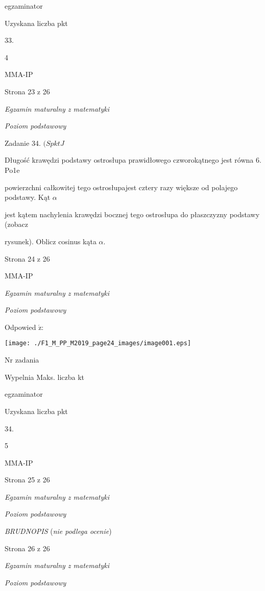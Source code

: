 \documentclass[a4paper,12pt]{article}
\begin{document}
egzaminator

Uzyskana liczba pkt

33.

4

MMA-IP

Strona 23 z 26





{\it Egzamin maturalny z matematyki}

{\it Poziom podstawowy}

Zadanie 34. $(SpktJ$

Długość krawędzi podstawy ostrosłupa prawidłowego czworokątnego jest równa 6. Po1e

powierzchni całkowitej tego ostrosłupajest cztery razy większe od polajego podstawy. Kąt $\alpha$

jest kątem nachylenia krawędzi bocznej tego ostrosłupa do płaszczyzny podstawy (zobacz

rysunek). Oblicz cosinus kąta $\alpha.$

Strona 24 z 26

MMA-IP





{\it Egzamin maturalny z matematyki}

{\it Poziom podstawowy}

Odpowied $\acute{\mathrm{z}}$:
\begin{center}
\texttt{[image: ./F1\_M\_PP\_M2019\_page24\_images/image001.eps]}
\end{center}
Nr zadania

Wypelnia Maks. liczba kt

egzaminator

Uzyskana liczba pkt

34.

5

MMA-IP

Strona 25 z 26





{\it Egzamin maturalny z matematyki}

{\it Poziom podstawowy}

{\it BRUDNOPIS} ({\it nie podlega ocenie})

Strona 26 z 26





{\it Egzamin maturalny z matematyki}

{\it Poziom podstawowy}
\end{document}
